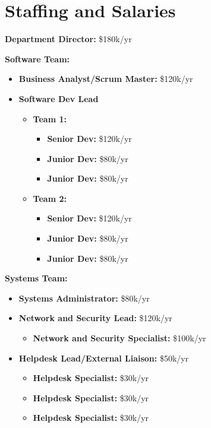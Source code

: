 \documentclass{report}
\begin{document}
\section{Staffing and Salaries}

\textbf{Department Director:} \$180k/yr

\textbf{Software Team:}
\begin{itemize}
    \item \textbf{Business Analyst/Scrum Master:} \$120k/yr
    \item \textbf{Software Dev Lead}
    \begin{itemize}
        \item \textbf{Team 1:}
        \begin{itemize}
            \item \textbf{Senior Dev:} \$120k/yr
            \item \textbf{Junior Dev:} \$80k/yr
            \item \textbf{Junior Dev:} \$80k/yr
        \end{itemize}
        \item \textbf{Team 2:}
        \begin{itemize}
            \item \textbf{Senior Dev:} \$120k/yr
            \item \textbf{Junior Dev:} \$80k/yr
            \item \textbf{Junior Dev:} \$80k/yr
        \end{itemize}
    \end{itemize}
\end{itemize}

\textbf{Systems Team:}
\begin{itemize}
    \item \textbf{Systems Administrator:} \$80k/yr
    \item \textbf{Network and Security Lead:} \$120k/yr
    \begin{itemize}
        \item \textbf{Network and Security Specialist:} \$100k/yr
    \end{itemize}
    \item \textbf{Helpdesk Lead/External Liaison:} \$50k/yr
    \begin{itemize}
        \item \textbf{Helpdesk Specialist:} \$30k/yr
        \item \textbf{Helpdesk Specialist:} \$30k/yr
        \item \textbf{Helpdesk Specialist:} \$30k/yr
    \end{itemize}
\end{itemize}
\end{document}
